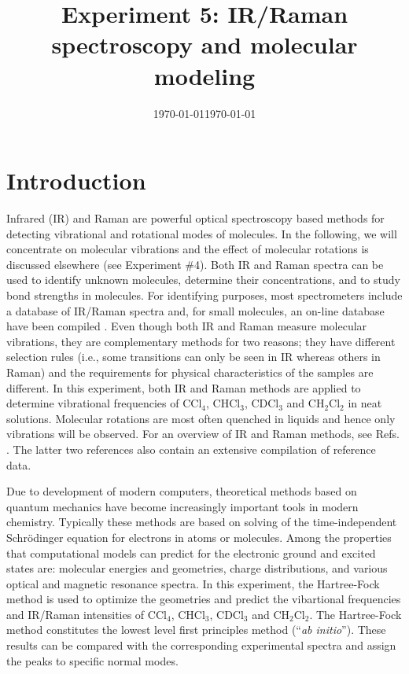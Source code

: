 \documentclass[byrevtex,amssymb,aps,pra,floatfix,letterpaper]{revtex4}
\date{\today}
\begin{document}
\title{Experiment 5: IR/Raman spectroscopy and molecular modeling}

\date{\today}

\maketitle

\section{Introduction}
Infrared (IR) and Raman are powerful optical spectroscopy based methods for  detecting vibrational and rotational modes of molecules. In the following, we will concentrate on molecular vibrations and the effect of molecular rotations is discussed elsewhere (see Experiment \#4). Both IR and Raman spectra can be used to identify unknown molecules, determine their concentrations, and to study bond strengths in molecules. For identifying purposes, most spectrometers include a database of IR/Raman spectra and, for small molecules, an on-line database have been compiled \cite{webbook}. Even though both IR and Raman measure molecular vibrations, they are complementary methods for two reasons; they have different selection rules (i.e., some transitions can only be seen in IR whereas others in
Raman) and the requirements for physical characteristics of the samples are different. In this experiment, both IR and Raman methods are applied to determine vibrational frequencies of CCl$_4$, CHCl$_3$, CDCl$_3$ and CH$_2$Cl$_2$ in neat solutions. Molecular rotations are most often quenched in liquids and hence only vibrations will be observed. For an overview of IR and Raman methods, see Refs. \cite{SILBEY,ATKINS1,HERZBERG1,HERZBERG2}. The latter two references also contain an extensive compilation of reference data.

Due to development of modern computers, theoretical methods based on quantum mechanics have become increasingly important tools in modern chemistry. Typically these methods are based on solving of the time-independent Schr\"odinger equation for electrons in atoms or molecules. Among the properties that computational models can predict for the electronic grou\-nd and excited states are: molecular energies and geometries, charge distributions, and various optical and magnetic resonance spectra. In this experiment, the Hartree-Fock method is used to optimize the geometries and predict the vibartional frequencies and IR/Raman intensities of CCl$_4$, CHCl$_3$, CDCl$_3$ and CH$_2$Cl$_2$. The Hartree-Fock method constitutes the lowest level first principles method (``{\it ab initio}''). These results can be compared with the corresponding experimental spectra and assign the peaks to specific
normal modes.
\end{document}
